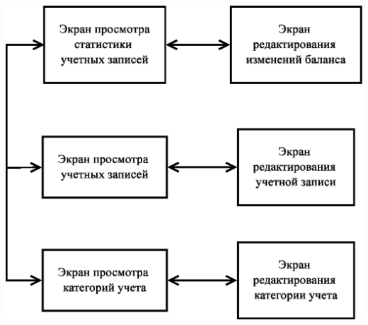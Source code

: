 \documentclass[russian,utf8,a1paper,nostitching,simple]{eskdgraph}
\begin{document}
\begin{ESKDdrawing}
\begin{minipage}{38cm}
    \vspace{4cm}
    \centering
     \\
    \vspace{2cm}
    \centering
    \includegraphics[height=25cm]{fig/design_activities.eps}
  \end{minipage}
  \hspace{2cm}

\end{ESKDdrawing}
\end{document}
